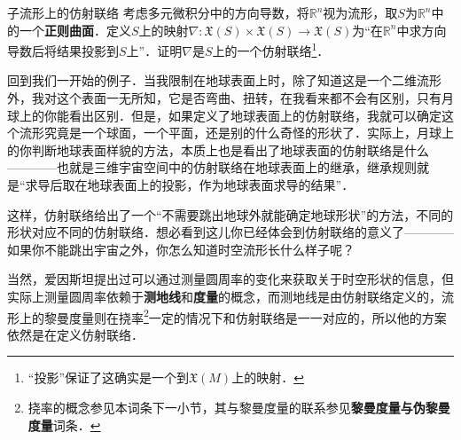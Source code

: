 \begin{exercise}{子流形上的仿射联络}
考虑多元微积分中的方向导数，将$\mathbb{R}^n$视为流形，取$S$为$\mathbb{R}^n$中的一个\textbf{正则曲面}．定义$S$上的映射$\nabla:\mathfrak{X}(S)\times\mathfrak{X}(S)\to\mathfrak{X}(S)$为“在$\mathbb{R}^n$中求方向导数后将结果投影到$S$上”．证明$\nabla$是$S$上的一个仿射联络\footnote{“投影”保证了这确实是一个到$\mathfrak{X}(M)$上的映射．}．
\end{exercise}

回到我们一开始的例子．当我限制在地球表面上时，除了知道这是一个二维流形外，我对这个表面一无所知，它是否弯曲、扭转，在我看来都不会有区别，只有月球上的你能看出区别．但是，如果定义了地球表面上的仿射联络，我就可以确定这个流形究竟是一个球面，一个平面，还是别的什么奇怪的形状了．实际上，月球上的你判断地球表面样貌的方法，本质上也是看出了地球表面的仿射联络是什么————也就是三维宇宙空间中的仿射联络在地球表面上的继承，继承规则就是“求导后取在地球表面上的投影，作为地球表面求导的结果”．

这样，仿射联络给出了一个“不需要跳出地球外就能确定地球形状”的方法，不同的形状对应不同的仿射联络．想必看到这儿你已经体会到仿射联络的意义了————如果你不能跳出宇宙之外，你怎么知道时空流形长什么样子呢？

当然，爱因斯坦提出过可以通过测量圆周率的变化来获取关于时空形状的信息，但实际上测量圆周率依赖于\textbf{测地线}和\textbf{度量}的概念，而测地线是由仿射联络定义的，流形上的黎曼度量则在挠率\footnote{挠率的概念参见本词条下一小节，其与黎曼度量的联系参见\textbf{黎曼度量与伪黎曼度量}词条．}一定的情况下和仿射联络是一一对应的，所以他的方案依然是在定义仿射联络．






